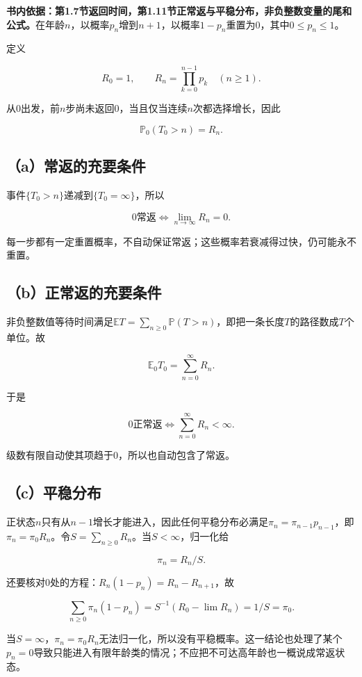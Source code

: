 \documentclass[
  11pt,a4paper,UTF8,fontset=fandol]{ctexart}
\begin{document}
\textbf{书内依据：第1.7节返回时间，第1.11节正常返与平稳分布，非负整数变量的尾和公式。}在年龄\(n\)，以概率\(p_n\)增到\(n+1\)，以概率\(1-p_n\)重置为0，其中\(0\le p_n\le1\)。

定义

\[R_0=1,\qquad R_n=\prod_{k=0}^{n-1}p_k\quad(n\ge1).\]

从0出发，前\(n\)步尚未返回0，当且仅当连续\(n\)次都选择增长，因此

\[\mathbb P_0(T_0>n)=R_n.\]

\subsection{（a）常返的充要条件}\label{aux5e38ux8fd4ux7684ux5145ux8981ux6761ux4ef6}

事件\(\{T_0>n\}\)递减到\(\{T_0=\infty\}\)，所以

\[\boxed{0\text{常返}\iff\lim_{n\to\infty}R_n=0.}\]

每一步都有一定重置概率，不自动保证常返；这些概率若衰减得过快，仍可能永不重置。

\subsection{（b）正常返的充要条件}\label{bux6b63ux5e38ux8fd4ux7684ux5145ux8981ux6761ux4ef6}

非负整数值等待时间满足\(\mathbb ET=\sum_{n\ge0}\mathbb P(T>n)\)，即把一条长度\(T\)的路径数成\(T\)个单位。故

\[\mathbb E_0T_0=\sum_{n=0}^\infty R_n.\]

于是

\[\boxed{0\text{正常返}\iff\sum_{n=0}^\infty R_n<\infty.}\]

级数有限自动使其项趋于0，所以也自动包含了常返。

\subsection{（c）平稳分布}\label{cux5e73ux7a33ux5206ux5e03}

正状态\(n\)只有从\(n-1\)增长才能进入，因此任何平稳分布必满足\(\pi_n=\pi_{n-1}p_{n-1}\)，即\(\pi_n=\pi_0R_n\)。令\(S=\sum_{n\ge0}R_n\)。当\(S<\infty\)，归一化给

\[\boxed{\pi_n=R_n/S.}\]

还要核对0处的方程：\(R_n(1-p_n)=R_n-R_{n+1}\)，故

\[\sum_{n\ge0}\pi_n(1-p_n)=S^{-1}(R_0-\lim R_n)=1/S=\pi_0.\]

当\(S=\infty\)，\(\pi_n=\pi_0R_n\)无法归一化，所以没有平稳概率。这一结论也处理了某个\(p_n=0\)导致只能进入有限年龄类的情况；不应把不可达高年龄也一概说成常返状态。
\end{document}
